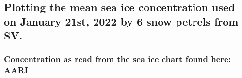 \documentclass[
]{article}
\newenvironment{Shaded}{\begin{snugshade}}{\end{snugshade}}
\newcommand{\CommentTok}[1]{\textcolor[rgb]{0.56,0.35,0.01}{\textit{#1}}}
\newcommand{\FunctionTok}[1]{\textcolor[rgb]{0.00,0.00,0.00}{#1}}
\newcommand{\NormalTok}[1]{#1}
\newcommand{\OtherTok}[1]{\textcolor[rgb]{0.56,0.35,0.01}{#1}}
\newcommand{\SpecialCharTok}[1]{\textcolor[rgb]{0.00,0.00,0.00}{#1}}
\newcommand{\StringTok}[1]{\textcolor[rgb]{0.31,0.60,0.02}{#1}}
\begin{document}
\begin{Shaded}
\end{Shaded}

\hypertarget{plotting-the-mean-sea-ice-concentration-used-on-january-21st-2022-by-6-snow-petrels-from-sv.}{%
\subsection{Plotting the mean sea ice concentration used on January
21st, 2022 by 6 snow petrels from
SV.}\label{plotting-the-mean-sea-ice-concentration-used-on-january-21st-2022-by-6-snow-petrels-from-sv.}}

\hypertarget{concentration-as-read-from-the-sea-ice-chart-found-here-aari}{%
\subsubsection{\texorpdfstring{Concentration as read from the sea ice
chart found here:
\href{http://ice.aari.aq/antice/2022/01/20220121_nic/}{AARI}}{Concentration as read from the sea ice chart found here: AARI}}\label{concentration-as-read-from-the-sea-ice-chart-found-here-aari}}
\end{document}
